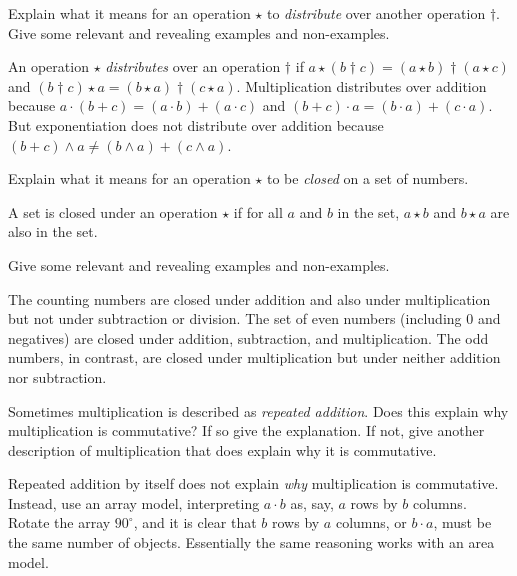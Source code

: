 \documentclass[nooutcomes]{ximera}
\begin{document}
\begin{problem}Explain what it means for an operation $\star$ to \textit{distribute}
  over another operation $\dagger$. Give some relevant and revealing
  examples and non-examples.
\begin{freeResponse}
\begin{hint}
An operation $\star$ \textit{distributes} over an operation $\dagger$ if $a\star(b\dagger c) = (a\star b) \dagger (a\star c)$ and $(b\dagger c)\star a = (b\star a) \dagger (c\star a)$.  
Multiplication distributes over addition because $a\cdot(b+c) = (a\cdot b)+(a\cdot c)$ and $(b+c)\cdot a = (b\cdot a)+(c\cdot a)$.  
But exponentiation does not distribute over addition because $(b+c)\wedge a \ne (b\wedge a)+(c\wedge a)$.
\end{hint}
\end{freeResponse}
\end{problem} 

\begin{problem}Explain what it means for an operation $\star$ to be \textit{closed}
  on a set of numbers. 
\begin{freeResponse}
\begin{hint}
A set is closed under an operation $\star$ if for all $a$ and $b$ in the set, $a\star b$ and $b\star a$ are also in the set.  
\end{hint}
\end{freeResponse}

\begin{problem}
Give some relevant and revealing examples and non-examples.
\begin{freeResponse}
\begin{hint}
The counting numbers are closed under addition and also under multiplication but not under subtraction or division.  The set of even numbers (including $0$ and negatives) are closed under addition, subtraction, and multiplication.  The odd numbers, in contrast, are closed under multiplication but under neither addition nor subtraction.
\end{hint}
\end{freeResponse}
\end{problem}
\end{problem} 

\begin{problem}Sometimes multiplication is described as \textit{repeated
  addition}. Does this explain why multiplication is commutative? If
  so give the explanation. If not, give another description of
  multiplication that does explain why it is commutative.
\begin{freeResponse}
\begin{hint}
Repeated addition by itself does not explain \textit{why} multiplication is commutative.  Instead, use an array model, interpreting $a\cdot b$ as, say, $a$ rows by $b$ columns.  Rotate the array $90^\circ$, and it is clear that $b$ rows by $a$ columns, or $b\cdot a$, must be the same number of objects.  Essentially the same reasoning works with an area model.  
\end{hint}
\end{freeResponse}
\end{problem} 
\end{document}
